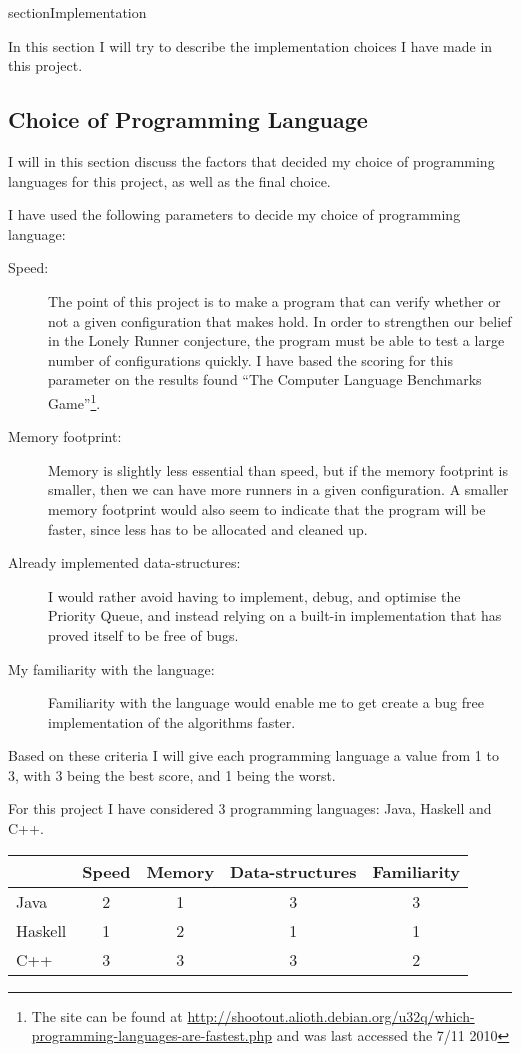 section{Implementation}
\label{implementation}

In this section I will try to describe the implementation choices I have made in this project.

\subsection{Choice of Programming Language}
I will in this section discuss the factors that decided my choice of programming languages for this project, as well as the final choice.

I have used the following parameters to decide my choice of programming language:
\begin{description}
\item[Speed:] The point of this project is to make a program that can verify whether or not a given configuration that makes  hold. In order to strengthen our belief in the Lonely Runner conjecture, the program must be able to test a large number of configurations quickly. I have based the scoring for this parameter on the results found ``The Computer Language Benchmarks Game''\footnote{The site can be found at \underline{http://shootout.alioth.debian.org/u32q/which-programming-languages-are-fastest.php} and was last accessed the 7/11 2010}.
\item[Memory footprint:] Memory is slightly less essential than speed, but if the memory footprint is smaller, then we can have more runners in a given configuration. A smaller memory footprint would also seem to indicate that the program will be faster, since less has to be allocated and cleaned up. 
\item[Already implemented data-structures:] I would rather avoid having to implement, debug, and optimise the Priority Queue, and instead relying on a built-in implementation that has proved itself to be free of bugs.
\item[My familiarity with the language:] Familiarity with the language would enable me to get create a bug free implementation of the algorithms faster.
\end{description}

Based on these criteria I will give each programming language a value from 1 to 3, with 3 being the best score, and 1 being the worst. 

For this project I have considered 3 programming languages: Java, Haskell and C++.

\begin{tabular}{l|c|c|c|c}
        & Speed & Memory & Data-structures & Familiarity \\
\hline
Java    & 2     &  1     &  3              &   3  \\
Haskell & 1     &  2     &  1              &   1  \\
C++     & 3     &  3     &  3              &   2  \\
\end{tabular}

